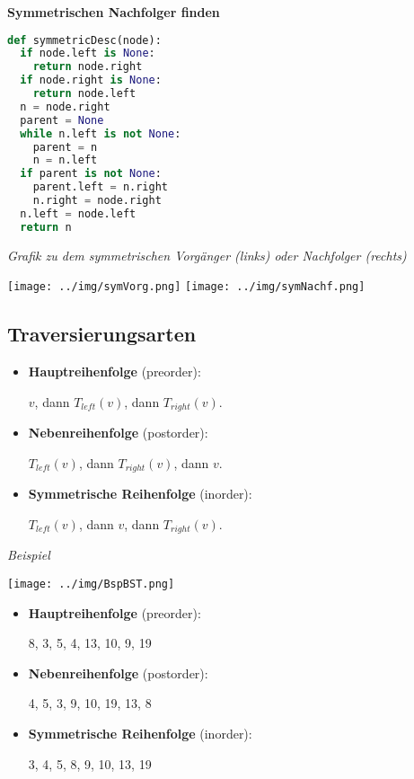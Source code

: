 \documentclass[german]{latex4ei/latex4ei_sheet}
\newcommand\tab[1][.3cm]{\hspace*{#1}}
\begin{document}
\begin{sectionbox}
\textbf{Symmetrischen Nachfolger finden}\par\vspace{-4px}
\begin{lstlisting}[language=Python]
def symmetricDesc(node):
  if node.left is None:
    return node.right
  if node.right is None:
    return node.left
  n = node.right
  parent = None
  while n.left is not None:
    parent = n
    n = n.left
  if parent is not None:
    parent.left = n.right
    n.right = node.right
  n.left = node.left
  return n
\end{lstlisting}\vspace{-6px}

\end{sectionbox}

\begin{sectionbox}
\textit{Grafik zu dem symmetrischen Vorgänger (links) oder Nachfolger (rechts)}\par
\begin{center}
\texttt{[image: ../img/symVorg.png]}
\tab \texttt{[image: ../img/symNachf.png]}    
\end{center}
\end{sectionbox}

\begin{sectionbox}
\subsection{Traversierungsarten}\smallskip
\begin{greenbox}
\begin{itemize}
    \item \textbf{Hauptreihenfolge} (preorder):
    \par $v$, dann $T_{left}(v)$, dann $T_{right}(v)$.
    \item \textbf{Nebenreihenfolge} (postorder):
    \par $T_{left}(v)$, dann $T_{right}(v)$, dann $v$.
    \item \textbf{Symmetrische Reihenfolge} (inorder):
    \par $T_{left}(v)$, dann $v$, dann $T_{right}(v)$.
\end{itemize}
\end{greenbox}\smallskip

\textit{Beispiel}\par
\texttt{[image: ../img/BspBST.png]}
\smallskip
\begin{itemize}
    \item \textbf{Hauptreihenfolge} (preorder):
    \par 8, 3, 5, 4, 13, 10, 9, 19
    \item \textbf{Nebenreihenfolge} (postorder):
    \par 4, 5, 3, 9, 10, 19, 13, 8
    \item \textbf{Symmetrische Reihenfolge} (inorder):
    \par 3, 4, 5, 8, 9, 10, 13, 19
\end{itemize}

\end{sectionbox}
\end{document}
